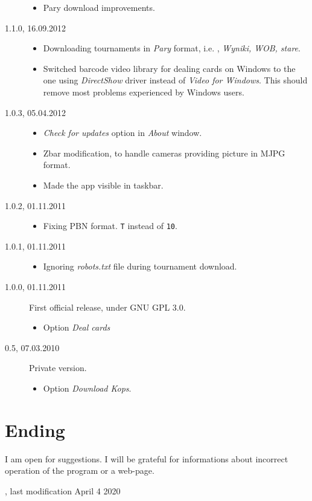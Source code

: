 \documentclass[polish,a4paper,11pt,oneside]{article}
\begin{document}
\begin{description}
\begin{itemize}
  \item Pary download improvements.
  \end{itemize}
\item[1.1.0, 16.09.2012]
  \begin{itemize}
  \item Downloading tournaments in {\em Pary} format,
        i.e. 
        , {\em Wyniki, WOB, stare}.
  \item Switched barcode video library for dealing cards on Windows
        to the one using
        {\em DirectShow} driver instead of
        {\em Video for Windows}. This should remove most problems
        experienced by Windows users.
  \end{itemize}
\item[1.0.3, 05.04.2012]
  \begin{itemize}
  \item {\em Check for updates} option in {\em About} window.
  \item Zbar modification, to handle cameras providing picture in
        MJPG format.
  \item Made the app visible in taskbar.
  \end{itemize}
\item[1.0.2, 01.11.2011]
  \begin{itemize}
  \item Fixing PBN format. \verb!T! instead of \verb!10!.
  \end{itemize}
\item[1.0.1, 01.11.2011]
  \begin{itemize}
  \item Ignoring {\em robots.txt} file during tournament download.
  \end{itemize}
\item[1.0.0, 01.11.2011]
  First official release, under GNU GPL 3.0.
  \begin{itemize}
  \item Option {\em Deal cards}
  \end{itemize}
\item[0.5, 07.03.2010]
  Private version.
  \begin{itemize}
  \item Option {\em Download Kops}.
  \end{itemize}
\end{description}

\section{Ending}

I am open for suggestions. I will be grateful for informations about incorrect operation of the program or a web-page.

{\setlength{\parindent}{0pt}\small{}
, last modification April 4 2020}
\end{document}
